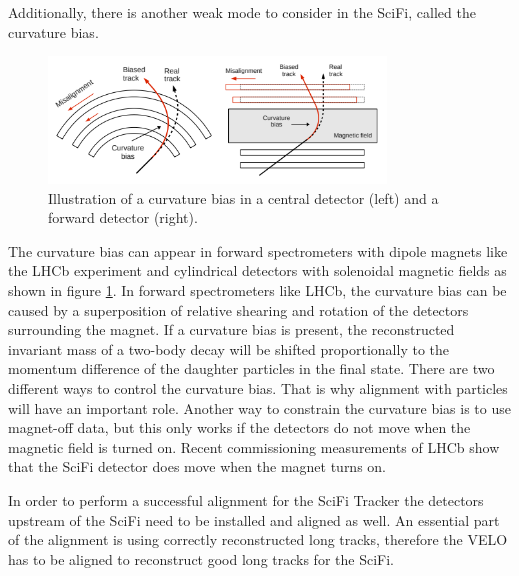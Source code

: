 Additionally, there is another weak mode to consider in the SciFi, called the curvature bias.
\begin{figure}
    \centering
    \includegraphics[width=0.8\textwidth]{plots/curvature_bias.png}
    \caption{Illustration of a curvature bias in a central detector (left) and a forward detector (right).}
    \label{fig:curvature}
\end{figure}
The curvature bias can appear in forward spectrometers with dipole magnets like the LHCb experiment and cylindrical detectors with solenoidal magnetic fields as shown in figure \ref{fig:curvature}.
In forward spectrometers like LHCb, the curvature bias can be caused by a superposition of relative shearing and rotation of the detectors surrounding the magnet. If a curvature bias is present, the reconstructed invariant mass of a two-body decay will be shifted proportionally to the momentum difference of the daughter particles in the final state\cite{1207.4756}.
There are two different ways to control the curvature bias. That is why alignment with particles will have an important role.
Another way to constrain the curvature bias is to use magnet-off data, but this only works if the detectors do not move when the magnetic field is turned on. Recent commissioning measurements of LHCb show that the SciFi detector does move when the magnet turns on.

In order to perform a successful alignment for the SciFi Tracker the detectors upstream of the SciFi need to be installed and aligned as well.
An essential part of the alignment is using correctly reconstructed long tracks, therefore the VELO has to be aligned to reconstruct good long tracks for the SciFi.

